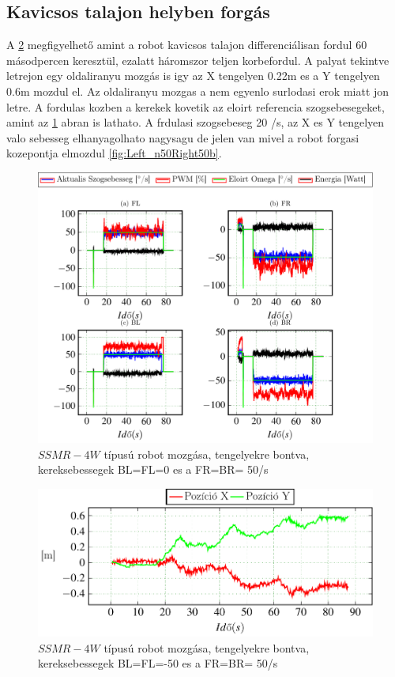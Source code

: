 \subsection{Kavicsos talajon helyben forgás}
A \ref{fig:Left_n50Right50a} megfigyelhető amint a robot kavicsos talajon differenciálisan fordul 60 másodpercen keresztül, ezalatt háromszor teljen korbefordul. A palyat tekintve letrejon egy oldaliranyu mozgás is igy az X tengelyen 0.22m es a Y tengelyen 0.6m mozdul el. Az oldaliranyu mozgas a nem egyenlo surlodasi erok miatt jon letre.
A fordulas kozben a kerekek kovetik az eloirt referencia szogsebesegeket, amint az \ref{fig:Left_n50Right50x} abran is lathato.
A frdulasi szogsebeseg 20 \degree/s, az X es Y tengelyen valo sebesseg elhanyagolhato nagysagu de jelen van mivel a robot forgasi kozepontja elmozdul \ref{fig:Left_n50Right50b}.

\renewcommand{\nth}{2}
\renewcommand{\GlobalPath}{Meresek/Mozgasok/NormalMukodes/DiferencialisanHelybeKavicsos/}
\renewcommand{\secondImage}{*}



\begin{figure}[H]
  \includegraphics{tikz/Left_n50Right50x.pdf}
  \caption{$SSMR-4W$ típusú robot mozgása, tengelyekre bontva, kereksebessegek BL=FL=0 es a FR=BR= 50\degree/s}
  \label{fig:Left_n50Right50x}
\end{figure}


\begin{figure}[H]
  \includegraphics{tikz/Left_n50Right50a.pdf}
  \caption{$SSMR-4W$ típusú robot mozgása, tengelyekre bontva, kereksebessegek BL=FL=-50 es a FR=BR= 50\degree/s}
  \label{fig:Left_n50Right50a}
\end{figure}


